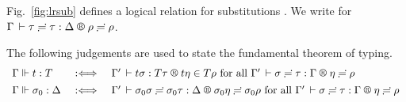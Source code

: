 \documentclass[acmsmall%
]{acmart}\settopmatter{printfolios=true}
\newcommand{\LONGVERSION}[1]{}
\begin{document}
Fig.~\ref{fig:lrsub} defines a logical relation for substitutions
\fbox{$\LRSub \Gamma \sigma \tau \Delta \eta \rho$}.
We write \fbox{$\LRS \Gamma \tau \Delta \rho$} for $\LRSub \Gamma \tau \tau \Delta \rho \rho$.

\LONGVERSION{ %
\begin{lemma}[Properties of the logical relation for substitutions]
  \label{lem:wklrsub}
  \bla \\
  Let $\LRSub \Gamma \sigma \tau \Delta \eta \rho$. Then:
  \begin{enumerate}
  \item Well-typedness: $\Gamma \der \sigma : \Delta$
   and $\Gamma \der \sigma = \sigma \eeq \tau : \Delta$
   [which in turn implies $\Gamma \der \tau : \Delta$].
  \item Weakening:
  If\/ $\xi : \Gamma' \leq \Gamma$ then
  $\LRSub{\Gamma'}{\sigma\xi}{\tau\xi}{\Delta}\eta\rho$.
  \item Resurrection:
  $\LRS {\resurrect\Gamma} \tau {\resurrect\Delta} \rho$.
  \item \label{it:sizesub} Size substitution:
  If\/ $\resurrect\Delta \der a : \Size$ then $a\eta \in \SIZE$.
  \end{enumerate}
\end{lemma}
} %
\LONGVERSION{
\begin{proof}
  For part (\ref{it:sizesub}), the only interesting case $a = \ind i + o$ can be proved by observing that $\eta(i) \in \SIZE$.
\end{proof}
} %

The following judgements are used to state the fundamental theorem of typing.
\[
\begin{array}{l@{\quad}l@{\quad}l}
  \Gamma \valid t : T & \defas & %
    \LR {\Gamma'} {t \sigma} {T \tau} {t \eta} {T \rho}
    \mforall \LRSub {\Gamma'} \sigma \tau \Gamma \eta \rho
\\[1ex]
  \Gamma \valid \sigma_0 : \Delta & \defas &
    \LRSub {\Gamma'} {\sigma_0 \sigma} {\sigma_0 \tau} \Delta {\sigma_0 \eta} {\sigma_0 \rho}
    \mforall \LRSub {\Gamma'} {\sigma} {\tau} \Gamma {\eta} {\rho}
\end{array}
\]
\end{document}
